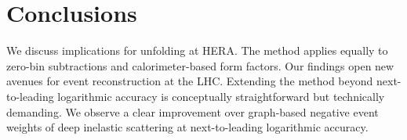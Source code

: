 \section{Conclusions}\label{sec:conclusions}

We discuss implications for unfolding at HERA. The method applies
equally to zero-bin subtractions and calorimeter-based form factors. Our
findings open new avenues for event reconstruction at the LHC. Extending
the method beyond next-to-leading logarithmic accuracy is conceptually
straightforward but technically demanding. We observe a clear
improvement over graph-based negative event weights of deep inelastic
scattering at next-to-leading logarithmic accuracy.

